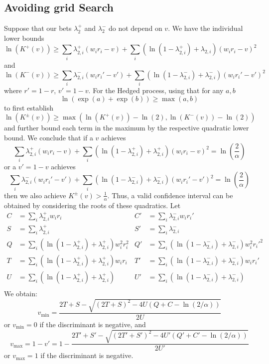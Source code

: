 \subsection{Avoiding grid Search}
Suppose that our bets $\lambda_2^{+}$ and $\lambda_2^{-}$ do not depend on $v$.
We have the individual lower bounds
\[
\ln(K^{+}(v)) \geq \sum_i \lambda_{2,i}^{+} (w_i r_i -v) + \sum_i (\ln(1-\lambda_{2,i}^{+})+\lambda_{2,i})(w_i r_i -v)^2
\]
and
\[
\ln(K^{-}(v)) \geq \sum_i \lambda_{2,i}^{-} (w_i r_i' -v') + \sum_i (\ln(1-\lambda_{2,i}^{-})+\lambda_{2,i}^{-})(w_i r_i' -v')^2
\]
where $r'=1-r$, $v'=1-v$.
For the Hedged process, using that for any $a,b$
\[
\ln\left(\exp(a)+\exp(b)\right)\geq \max(a,b)
\]
to first establish
\[
\ln(K^{\pm}(v)) \geq \max(\ln(K^{+}(v))-\ln(2),\ln(K^{-}(v))-\ln(2))
\]
and further bound each term in the maximum by the respective 
quadratic lower bound. We conclude that
if a $v$ achieves 
\[
\sum_i \lambda_{2,i}^{+} (w_i r_i -v) + \sum_i (\ln(1-\lambda_{2,i}^{+})+\lambda_{2,i}^{+})(w_i r_i -v)^2 = \ln\left(\frac{2}{\alpha}\right)
\]
or a $v'=1-v$ achieves 
\[
\sum_i \lambda_{2,i}^{-} (w_i r_i'-v') + \sum_i (\ln(1-\lambda_{2,i}^{-})+\lambda_{2,i}^{-})(w_i r_i' - v')^2
=\ln\left(\frac{2}{\alpha}\right)
\]
then we also achieve $K^{\pm}(v) > \frac{1}{\alpha}$. 
Thus, a valid confidence interval can be obtained by considering
the roots of these quadratics.  Let
\begin{align*}
C&=\sum_i \lambda_{2,i}^{+} w_i r_i & 
C'&=\sum_i \lambda_{2,i}^{-} w_i r_i'\\
S&=\sum_i \lambda_{2,i}^{+} & 
S'&=\sum_i \lambda_{2,i}^{-} \\
Q&=\sum_i \left(\ln(1-\lambda_{2,i}^{+})+\lambda_{2,i}^{+}\right) w_i^2 r_i^2 &
Q'&=\sum_i \left(\ln(1-\lambda_{2,i}^{-})+\lambda_{2,i}^{-}\right) w_i^2 r_i'^2\\
T&=\sum_i \left(\ln(1-\lambda_{2,i}^{+})+\lambda_{2,i}^{+}\right) w_ir_i &
T'&=\sum_i \left(\ln(1-\lambda_{2,i}^{-})+\lambda_{2,i}^{-}\right) w_ir_i'\\
U&=\sum_i \left(\ln(1-\lambda_{2,i}^{+})+\lambda_{2,i}^{+}\right) &
U'&=\sum_i \left(\ln(1-\lambda_{2,i}^{-})+\lambda_{2,i}^{-}\right)\\
\end{align*}
We obtain:
\[
v_{\min}= \frac{2T+S-\sqrt{(2T+S)^2-4U(Q+C-\ln(2/\alpha))}}{2U}
\]
or $v_{\min}=0$ if the discriminant is negative, 
and
\[
v_{\max}=1-v' = 1-\frac{2T'+S'-\sqrt{(2T'+S')^2-4U'(Q'+C'-\ln(2/\alpha))}}{2U'}
\]
or $v_{\max}=1$ if the discriminant is negative.

